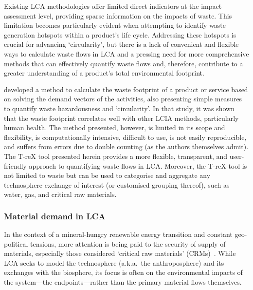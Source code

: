Existing LCA methodologies offer limited direct indicators at the impact assessment level, providing sparse information on the impacts of waste. This limitation becomes particularly evident when attempting to identify waste generation hotspots within a product's life cycle. Addressing these hotspots is crucial for advancing `circularity', but there is a lack of convenient and flexible ways to calculate waste flows in LCA and a pressing need for more comprehensive methods that can effectively quantify waste flows and, therefore, contribute to a greater understanding of a product's total environmental footprint. 


\cite{laurenti2023wastefootprint} developed a method to calculate the waste footprint of a product or service based on solving the demand vectors of the activities, also presenting simple measures to quantify waste hazardousness and `circularity'. In that study, it was shown that the waste footprint correlates well with other LCIA methods, particularly human health. The method presented, however, is limited in its scope and flexibility, is computationally intensive, difficult to use, is not easily reproducible, and suffers from errors due to double counting (as the authors themselves admit). The T-reX tool presented herein provides a more flexible, transparent, and user-friendly approach to quantifying waste flows in LCA. Moreover, the T-reX tool is not limited to waste but can be used to categorise and aggregate any technosphere exchange of interest (or customised grouping thereof), such as water, gas, and critical raw materials. 

\subsubsection{Material demand in LCA}

In the context of a mineral-hungry renewable energy transition and constant geo-political tensions, more attention is being paid to the security of supply of materials, especially those considered `critical raw materials' (CRMs)~\citep{eu2023crmstudy,hool2023crm,mancini2013supplysecurity,jrc2023supplychain,hartley2024cepolitics,salviulo2021supplychain}. While LCA seeks to model the technosphere (a.k.a.\ the anthroposphere) and its exchanges with the biosphere, its focus is often on the environmental impacts of the system---the endpoints---rather than the primary material flows themselves. 

